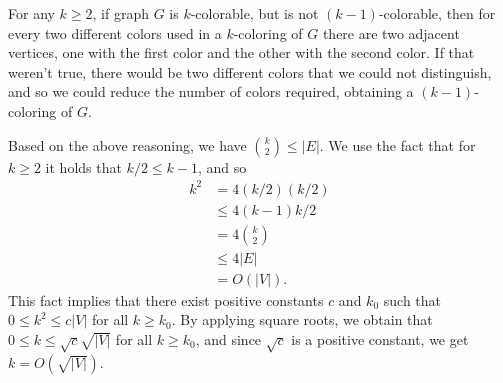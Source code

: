 For any $k\ge2$, if graph $G$ is $k$-colorable, but is not $(k-1)$-colorable, then for every two different colors used in a $k$-coloring of $G$ there are two adjacent vertices, one with the first color and the other with the second color.
If that weren't true, there would be two different colors that we could not distinguish, and so we could reduce the number of colors required, obtaining a $(k-1)$-coloring of $G$.

Based on the above reasoning, we have $\binom{k}{2}\le|E|$.
We use the fact that for $k\ge2$ it holds that $k/2\le k-1$, and so
\begin{align*}
    k^2 &= 4(k/2)(k/2) \\[2mm]
    &\le 4(k-1)k/2 \\
    &= 4\binom{k}{2} \\[1mm]
    &\le 4|E| \\
    &= O(|V|).
\end{align*}
This fact implies that there exist positive constants $c$ and $k_0$ such that $0\le k^2\le c|V|$ for all $k\ge k_0$.
By applying square roots, we obtain that $0\le k\le\sqrt{c}\sqrt{|V|}$ for all $k\ge k_0$, and since $\sqrt{c}$ is a positive constant, we get $k=O(\sqrt{|V|})$.
